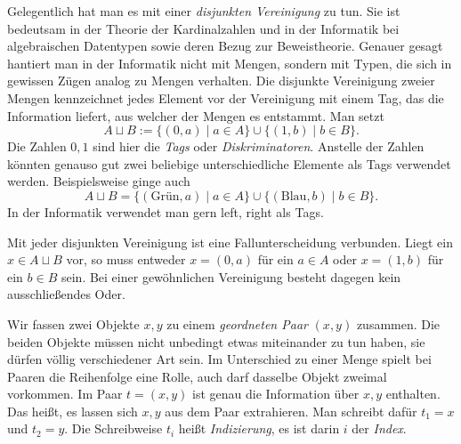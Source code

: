 \noindent
Gelegentlich hat man es mit einer \emph{disjunkten Vereinigung}%
 zu tun. Sie ist bedeutsam in der
Theorie der Kardinalzahlen und in der Informatik bei algebraischen
Datentypen sowie deren Bezug zur Beweistheorie. Genauer gesagt hantiert
man in der Informatik nicht mit Mengen, sondern mit Typen, die sich
in gewissen Zügen analog zu Mengen verhalten. Die disjunkte Vereinigung
zweier Mengen kennzeichnet jedes Element vor der Vereinigung mit einem
Tag, das die Information liefert, aus welcher der Mengen es entstammt.
Man setzt%
\[A\sqcup B := \{(0,a)\mid a\in A\}\cup\{(1,b)\mid b\in B\}.\]
Die Zahlen $0,1$ sind hier die \emph{Tags} oder \emph{Diskriminatoren}.
Anstelle der Zahlen könnten genauso gut zwei beliebige unterschiedliche
Elemente als Tags verwendet werden. Beispielsweise ginge auch%
\[A\sqcup B = \{(\text{Grün},a)\mid a\in A\}\cup\{(\text{Blau},b)\mid b\in B\}.\]
In der Informatik verwendet man gern left, right als Tags.

Mit jeder disjunkten Vereinigung ist eine Fallunterscheidung verbunden.
Liegt ein $x\in A\sqcup B$ vor, so muss entweder $x=(0,a)$ für ein
$a\in A$ oder $x=(1,b)$ für ein $b\in B$ sein. Bei einer gewöhnlichen
Vereinigung besteht dagegen kein ausschließendes Oder.

Wir fassen zwei Objekte $x,y$ zu einem \emph{geordneten Paar}%
 $(x,y)$ zusammen. Die beiden
Objekte müssen nicht unbedingt etwas miteinander zu tun haben, sie
dürfen völlig verschiedener Art sein. Im Unterschied zu einer Menge
spielt bei Paaren die Reihenfolge eine Rolle, auch darf dasselbe Objekt
zweimal vorkommen. Im Paar $t=(x,y)$ ist genau die Information über
$x,y$ enthalten. Das heißt, es lassen sich $x,y$ aus dem Paar
extrahieren. Man schreibt dafür $t_1=x$ und $t_2=y$. Die Schreibweise
$t_i$ heißt \emph{Indizierung}, es ist darin $i$ der
\emph{Index}.

